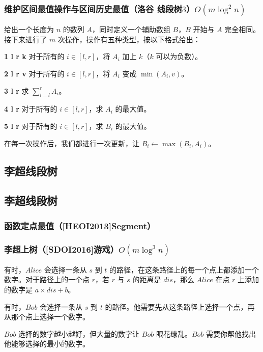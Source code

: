 \documentclass[landscape,twocolumn,twoside,a4paper]{article}
\begin{document}
\subsubsection{维护区间最值操作与区间历史最值（洛谷 线段树$3$）$O(m \log ^{2}n)$}
给出一个长度为 $n$ 的数列 $A$，同时定义一个辅助数组 $B$，$B$ 开始与 $A$ 完全相同。接下来进行了 $m$ 次操作，操作有五种类型，按以下格式给出：\par
\textbf{1 l r k} 对于所有的 $i\in[l,r]$，将 $A_i$ 加上 $k$（$k$ 可以为负数）。\par
\textbf{2 l r v} 对于所有的 $i\in[l,r]$，将 $A_i$ 变成 $\min(A_i,v)$。\par
\textbf{3 l r} 求 $\sum_{i=l}^{r}A_i$。\par
\textbf{4 l r} 对于所有的 $i\in[l,r]$，求 $A_i$ 的最大值。\par
\textbf{5 l r} 对于所有的 $i\in[l,r]$，求 $B_i$ 的最大值。\par
在每一次操作后，我们都进行一次更新，让 $B_i\gets\max(B_i,A_i)$。\par


\subsection{李超线段树}

\subsection{李超线段树}
\subsubsection{函数定点最值（[HEOI2013]Segment）}


\subsubsection{李超上树（[SDOI2016]游戏）$O(m \log ^{3}n)$}
有时，$Alice$ 会选择一条从 $s$ 到 $t$ 的路径，在这条路径上的每一个点上都添加一个数字。对于路径上的一个点 $r$，若 $r$ 与 $s$ 的距离是 $dis$，那么 $Alice$ 在点 $r$ 上添加的数字是 $a\times dis + b$。\par
有时，$Bob$ 会选择一条从 $s$ 到 $t$ 的路径。他需要先从这条路径上选择一个点，再从那个点上选择一个数字。\par
$Bob$ 选择的数字越小越好，但大量的数字让 $Bob$ 眼花缭乱。$Bob$ 需要你帮他找出他能够选择的最小的数字。

\end{document}
